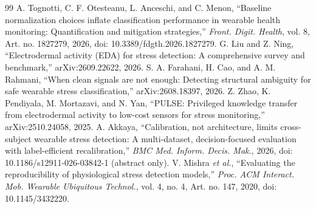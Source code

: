 \documentclass[journal]{IEEEtran}
\begin{document}
\begin{thebibliography}{99}
 A. Tognotti, C. F. Otesteanu, L. Anceschi, and C. Menon, ``Baseline normalization choices inflate classification performance in wearable health monitoring: Quantification and mitigation strategies,'' \emph{Front. Digit. Health}, vol. 8, Art. no. 1827279, 2026, doi: 10.3389/fdgth.2026.1827279.
 G. Liu and Z. Ning, ``Electrodermal activity (EDA) for stress detection: A comprehensive survey and benchmark,'' arXiv:2609.22622, 2026.
 S. A. Farahani, H. Cao, and A. M. Rahmani, ``When clean signals are not enough: Detecting structural ambiguity for safe wearable stress classification,'' arXiv:2608.18397, 2026.
 Z. Zhao, K. Pendiyala, M. Mortazavi, and N. Yan, ``PULSE: Privileged knowledge transfer from electrodermal activity to low-cost sensors for stress monitoring,'' arXiv:2510.24058, 2025.
 A. Akkaya, ``Calibration, not architecture, limits cross-subject wearable stress detection: A multi-dataset, decision-focused evaluation with label-efficient recalibration,'' \emph{BMC Med. Inform. Decis. Mak.}, 2026, doi: 10.1186/s12911-026-03842-1 (abstract only).
 V. Mishra \emph{et al.}, ``Evaluating the reproducibility of physiological stress detection models,'' \emph{Proc. ACM Interact. Mob. Wearable Ubiquitous Technol.}, vol. 4, no. 4, Art. no. 147, 2020, doi: 10.1145/3432220.
\end{thebibliography}
\end{document}
